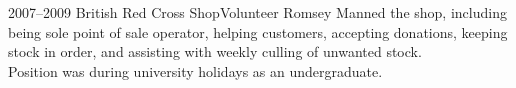 \documentclass[print, oneside]{friggeri-cv} %
\begin{document}
\begin{entrylist}

\entry
{2007--2009}
{British Red Cross Shop}{Volunteer}
{Romsey}
{Manned the shop, including being sole point of sale operator, helping customers, accepting donations, keeping stock in order, and assisting with weekly culling of unwanted stock.\\
Position was during university holidays as an undergraduate.}




\end{entrylist}

%
%
%
%
%
%







%
%
\end{document}

